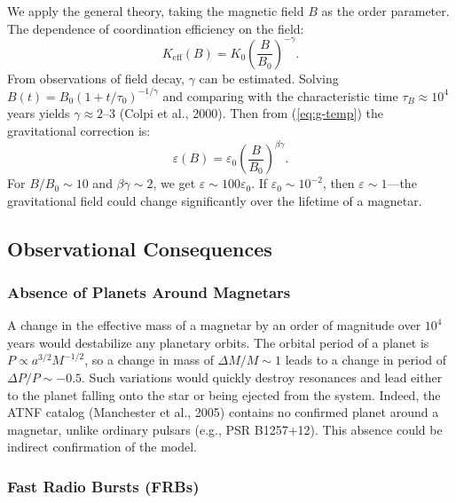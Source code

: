 \documentclass[12pt]{article}
\theoremstyle{remark}
\newcommand{\Keff}{K_{\mathrm{eff}}}
\newcommand{\eps}{\varepsilon}
\begin{document}
	We apply the general theory, taking the magnetic field $B$ as the order parameter. The dependence of coordination efficiency on the field:
	\begin{equation}
		\Keff(B) = K_0 \left( \frac{B}{B_0} \right)^{-\gamma}.
		\label{eq:keff-b}
	\end{equation}
	From observations of field decay, $\gamma$ can be estimated. Solving $B(t) = B_0 (1 + t/\tau_0)^{-1/\gamma}$ and comparing with the characteristic time $\tau_B \approx 10^4$ years yields $\gamma \approx 2$–$3$ (Colpi et al., 2000). Then from (\ref{eq:g-temp}) the gravitational correction is:
	\begin{equation}
		\eps(B) = \eps_0 \left( \frac{B}{B_0} \right)^{\beta\gamma}.
		\label{eq:eps-b}
	\end{equation}
	For $B/B_0 \sim 10$ and $\beta\gamma \sim 2$, we get $\eps \sim 100 \eps_0$. If $\eps_0 \sim 10^{-2}$, then $\eps \sim 1$—the gravitational field could change significantly over the lifetime of a magnetar.
	
	\subsection{Observational Consequences}
	\label{subsec:magnetars-consequences}
	
	\subsubsection{Absence of Planets Around Magnetars}
	\label{subsubsec:magnetars-planets}
	
	A change in the effective mass of a magnetar by an order of magnitude over $10^4$ years would destabilize any planetary orbits. The orbital period of a planet is $P \propto a^{3/2} M^{-1/2}$, so a change in mass of $\Delta M/M \sim 1$ leads to a change in period of $\Delta P/P \sim -0.5$. Such variations would quickly destroy resonances and lead either to the planet falling onto the star or being ejected from the system. Indeed, the ATNF catalog (Manchester et al., 2005) contains no confirmed planet around a magnetar, unlike ordinary pulsars (e.g., PSR B1257+12). This absence could be indirect confirmation of the model.
	
	\subsubsection{Fast Radio Bursts (FRBs)}\label{subsec:magnetars-frb}
	
\end{document}
